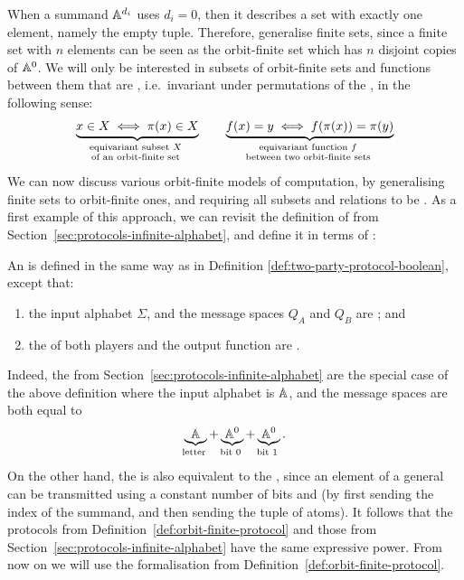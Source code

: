 \AP
When a summand $\mathbb A^{d_i}$ uses $d_i =0$, then it  describes a set with
exactly one element, namely the empty tuple. Therefore, 
generalise finite sets, since a  finite set with $n$ elements can be seen as
the orbit-finite set which has $n$ disjoint copies of $\mathbb A^0$. We will only
be interested in subsets of orbit-finite sets and functions between them that
are , i.e.~invariant under permutations of the , in
the following sense:
\begin{align*}
\myunderbrace{x \in X \iff \pi(x) \in X}{equivariant subset $X$ \\ of an orbit-finite set}
\qquad 
\myunderbrace{f(x) = y \iff f(\pi(x)) = \pi(y)}{equivariant function $f$ \\ between two orbit-finite sets}
\end{align*}
We can now discuss various orbit-finite models of computation, by generalising
finite sets to orbit-finite ones, and requiring all subsets and relations to be
. As a first example of this approach, we can revisit the definition
of  from Section~\ref{sec:protocols-infinite-alphabet}, and
define it in terms of :

\begin{definition}
    \label{def:orbit-finite-protocol}
    \AP
    An 
    is defined in the same way as in Definition \ref{def:two-party-protocol-boolean}, except that:
  \begin{enumerate}
    \item the input alphabet $\Sigma$, and the message spaces $Q_A$ and $Q_B$ are ; and 
    \item the  of both players and the output function are .
  \end{enumerate}
\end{definition}

Indeed, the  from
Section~\ref{sec:protocols-infinite-alphabet} are the special case of the above
definition where the input alphabet is $\mathbb A$, and the message spaces are
both equal to 
\begin{align*}
\myunderbrace{\atoms}{letter} + \myunderbrace{\atoms^0}{bit 0} + \myunderbrace{\atoms^0}{bit 1}.
\end{align*}
On the other hand, the  is also
equivalent to the , since an element of a general 
can be transmitted using a constant number of bits and  (by first sending
the index of the summand, and then sending the tuple of atoms). It follows that
the protocols from Definition~\ref{def:orbit-finite-protocol} and those from
Section~\ref{sec:protocols-infinite-alphabet} have the same expressive power.
From now on we will use the formalisation from
Definition~\ref{def:orbit-finite-protocol}.

